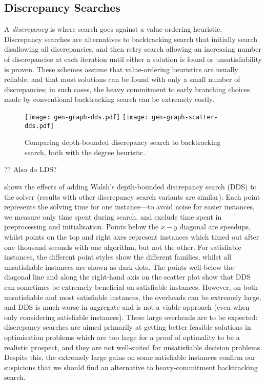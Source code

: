 \documentclass[runningheads]{llncs}
\begin{document}
\subsection{Discrepancy Searches}

A \emph{discrepancy} is where search goes against a value-ordering heuristic.  Discrepancy searches
\cite{DBLP:conf/ijcai/HarveyG95,DBLP:conf/aaai/Korf96,DBLP:conf/ijcai/Walsh97,DBLP:conf/cpaior/KarouiHLN07}
are alternatives to backtracking search that initially search disallowing all discrepancies, and
then retry search allowing an increasing number of discrepancies at each iteration until either a
solution is found or unsatisfiability is proven. These schemes assume that value-ordering heuristics
are usually reliable, and that most solutions can be found with only a small number of
discrepancies; in such cases, the heavy commitment to early branching choices made by conventional
backtracking search can be extremely costly.

\begin{figure}[tb]
    \texttt{[image: gen-graph-dds.pdf]}
    \hfill
    \texttt{[image: gen-graph-scatter-dds.pdf]}

    \caption{Comparing depth-bounded discrepancy search to backtracking search, both with the degree
    heuristic.}\label{figure:scatter-dds}
\end{figure}

?? Also do LDS?

 shows the effects of adding Walsh's \cite{DBLP:conf/ijcai/Walsh97}
depth-bounded discrepancy search (DDS) to the solver (results with other discrepancy search variants
are similar).  Each point represents the solving time for one instance---to avoid noise for easier
instances, we measure only time spent during search, and exclude time spent in preprocessing and
initialisation.  Points below the $x-y$ diagonal are speedups, whilst points on the top and right
axes represent instances which timed out after one thousand seconds with one algorithm, but not the
other. For satisfiable instances, the different point styles show the different families, whilst all
unsatisfiable instances are shown as dark dots.  The points well below the diagonal line and along
the right-hand axis on the scatter plot show that DDS can sometimes be extremely beneficial on
satisfiable instances.  However, on both unsatisfiable and most satisfiable instances, the overheads
can be extremely large, and DDS is much worse in aggregate and is not a viable approach (even when
only considering satisfiable instances).  These large overheads are to be expected: discrepancy
searches are aimed primarily at getting better feasible solutions in optimisation problems which are
too large for a proof of optimality to be a realistic prospect, and they are not well-suited for
unsatisfiable decision problems. Despite this, the extremely large gains on some satisfiable
instances confirm our suspicions that we should find an alternative to heavy-commitment backtracking
search.
\end{document}
